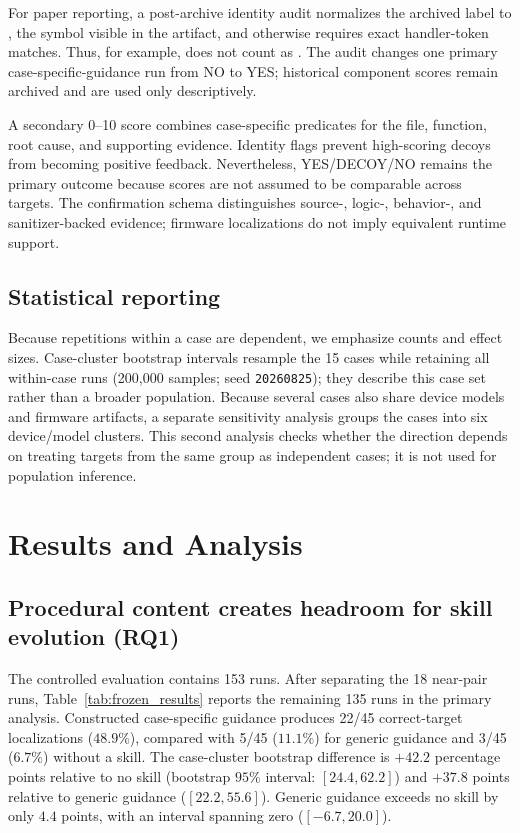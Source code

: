 \documentclass[11pt]{article}
\begin{document}
For paper reporting, a post-archive identity audit normalizes the archived label
 to , the symbol visible in the artifact, and otherwise
requires exact handler-token matches.  Thus, for example,  does
not count as .  The audit changes
one primary case-specific-guidance run from NO to YES; historical component scores remain archived
and are used only descriptively.

A secondary 0--10 score combines case-specific predicates for the file, function, root
cause, and supporting evidence.  Identity flags prevent high-scoring decoys from
becoming positive feedback.  Nevertheless, YES/DECOY/NO remains the primary outcome
because scores are not assumed to be comparable across targets.  The confirmation schema distinguishes source-,
logic-, behavior-, and sanitizer-backed evidence; firmware localizations do not imply
equivalent runtime support.

\subsection{Statistical reporting}

Because repetitions within a case are dependent, we emphasize counts and effect sizes.
Case-cluster bootstrap intervals resample the 15 cases while retaining all within-case
runs (200,000 samples; seed \texttt{20260825}); they describe this case set rather than
a broader population.  Because several cases also share device models and firmware
artifacts, a separate sensitivity analysis groups the cases into six device/model
clusters.  This second analysis checks whether the direction depends on treating targets
from the same group as independent cases; it is not used for population inference.

\section{Results and Analysis}
\label{sec:results}

\subsection{Procedural content creates headroom for skill evolution (RQ1)}

The controlled evaluation contains 153 runs.  After separating the 18 near-pair runs,
Table~\ref{tab:frozen_results} reports the remaining 135 runs in the primary analysis.
Constructed case-specific guidance produces 22/45 correct-target localizations ($48.9\%$),
compared with 5/45 ($11.1\%$) for generic guidance and 3/45 ($6.7\%$) without a skill.
The case-cluster bootstrap difference is $+42.2$ percentage points relative
to no skill (bootstrap $95\%$ interval: $[24.4, 62.2]$) and $+37.8$ points relative to
generic guidance ($[22.2, 55.6]$).  Generic guidance exceeds no skill by only $4.4$ points, with an
interval spanning zero ($[-6.7, 20.0]$).
\end{document}
